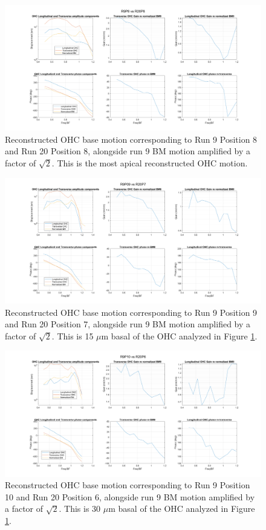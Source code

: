\documentclass{article}
\begin{document}
\begin{figure}
	\centering
	\includegraphics[width=\textwidth]{"Figures/R9P8OHC.png"}
	\caption{Reconstructed OHC base motion corresponding to Run 9 Position 8 and Run 20 Position 8, alongside run 9 BM motion amplified by a factor of $\sqrt{2}$. This is the most apical reconstructed OHC motion.}
	\label{r8}
\end{figure}
\begin{figure}
	\centering
	\includegraphics[width=\textwidth]{"Figures/R9P9OHC.png"}
	\caption{Reconstructed OHC base motion corresponding to Run 9 Position 9 and Run 20 Position 7, alongside run 9 BM motion amplified by a factor of $\sqrt{2}$. This is 15 $\mu$m basal of the OHC analyzed in Figure \ref{r8}.} 
	\label{r9}
\end{figure}
\begin{figure}
	\centering
	\includegraphics[width=\textwidth]{"Figures/R9P10OHC.png"}
	\caption{Reconstructed OHC base motion corresponding to Run 9 Position 10 and Run 20 Position 6, alongside run 9 BM motion amplified by a factor of $\sqrt{2}$. This is 30 $\mu$m basal of the OHC analyzed in Figure \ref{r8}.}
	\label{r10}
\end{figure}
\end{document}
